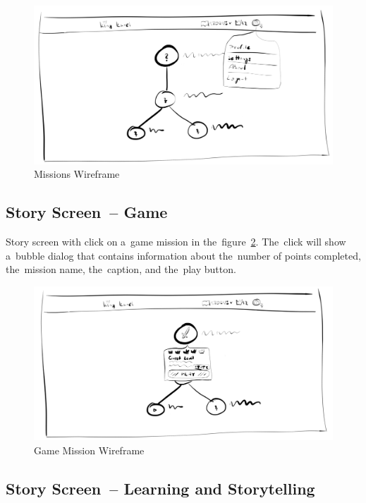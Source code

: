 \begin{figure}
    \centering
    \includegraphics[width=1\linewidth]{assets/design/ui/wir_stories.png}
    \caption{Missions Wireframe}
    \label{fig:design:wir:missions}
\end{figure}

\subsection{Story Screen~-- Game}

Story screen with click on a~game mission in the~figure~\ref{fig:design:wir:story-game}.
The~click will show a~bubble dialog that contains information about the~number of points completed, the~mission name, the~caption, and the~play button.

\begin{figure}
    \centering
    \includegraphics[width=1\linewidth]{assets/design/ui/wir_game.png}
    \caption{Game Mission Wireframe}
    \label{fig:design:wir:story-game}
\end{figure}

\subsection{Story Screen~-- Learning and Storytelling}

